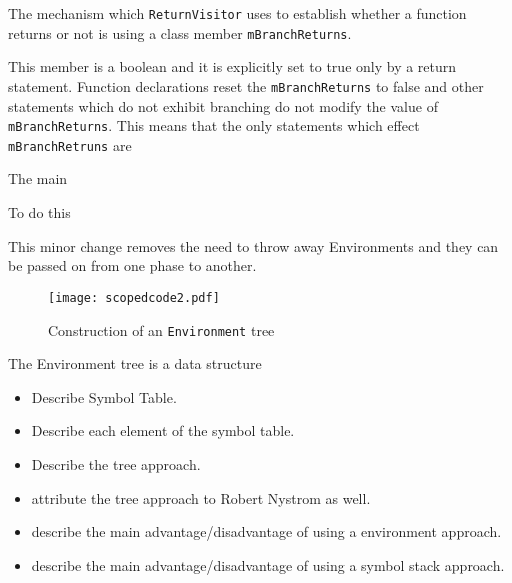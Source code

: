The mechanism which \texttt{ReturnVisitor} uses to establish
whether a function returns or not is using a class member
\texttt{mBranchReturns}.

This member is a boolean and it is explicitly set to true only
by a return statement. Function declarations reset the \texttt{mBranchReturns}
to false and other statements which do not exhibit branching do not
modify the value of \texttt{mBranchReturns}. This means that the
only statements which effect \texttt{mBranchRetruns} are


The main


To do this

This minor change removes the need to throw away Environments
and they can be passed on from one phase to another.

\begin{figure}[H]
\centering
\begin{mdframed}[backgroundcolor=UMPaleRed]
\texttt{[image: scopedcode2.pdf]}
\end{mdframed}
\caption{Construction of an \texttt{Environment} tree}
\label{fig:scopedcode2}
\end{figure}

The Environment tree is a data structure

\begin{itemize}
    \item Describe Symbol Table.
    \item Describe each element of the symbol table.
    \item Describe the tree approach.
    \item attribute the tree approach to Robert Nystrom as well.
    \item describe the main advantage/disadvantage of using a environment
        approach.
    \item describe the main advantage/disadvantage of using a symbol stack
        approach.
\end{itemize}
